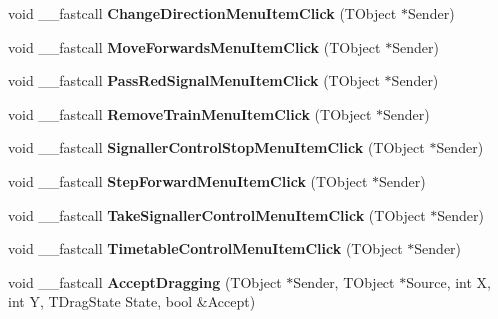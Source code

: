 \begin{DoxyCompactItemize}
\item 
\mbox{\label{class_t_interface_aaaf32c3c815553f7ba70698e0f0071bb}} 
void \+\_\+\+\_\+fastcall {\bfseries Change\+Direction\+Menu\+Item\+Click} (T\+Object $\ast$Sender)
\item 
\mbox{\label{class_t_interface_a50478cade5cae721121f5902528987a7}} 
void \+\_\+\+\_\+fastcall {\bfseries Move\+Forwards\+Menu\+Item\+Click} (T\+Object $\ast$Sender)
\item 
\mbox{\label{class_t_interface_ad7aaed58c91a9ad9598e17fa615024da}} 
void \+\_\+\+\_\+fastcall {\bfseries Pass\+Red\+Signal\+Menu\+Item\+Click} (T\+Object $\ast$Sender)
\item 
\mbox{\label{class_t_interface_a921ff57bd9af8acdd79a7c99d4839218}} 
void \+\_\+\+\_\+fastcall {\bfseries Remove\+Train\+Menu\+Item\+Click} (T\+Object $\ast$Sender)
\item 
\mbox{\label{class_t_interface_a2313bac2c5c5ac3f8b91c46166e35b97}} 
void \+\_\+\+\_\+fastcall {\bfseries Signaller\+Control\+Stop\+Menu\+Item\+Click} (T\+Object $\ast$Sender)
\item 
\mbox{\label{class_t_interface_a0cc484aa9bc0445312ef9191d8212f14}} 
void \+\_\+\+\_\+fastcall {\bfseries Step\+Forward\+Menu\+Item\+Click} (T\+Object $\ast$Sender)
\item 
\mbox{\label{class_t_interface_ab5b80c76a8cc8d2c87f21d323f61c1ce}} 
void \+\_\+\+\_\+fastcall {\bfseries Take\+Signaller\+Control\+Menu\+Item\+Click} (T\+Object $\ast$Sender)
\item 
\mbox{\label{class_t_interface_aec12f0e481024f1268fad36e7188b7a4}} 
void \+\_\+\+\_\+fastcall {\bfseries Timetable\+Control\+Menu\+Item\+Click} (T\+Object $\ast$Sender)
\item 
\mbox{\label{class_t_interface_adfe259347a82aae9fc9538bba9c51cb8}} 
void \+\_\+\+\_\+fastcall {\bfseries Accept\+Dragging} (T\+Object $\ast$Sender, T\+Object $\ast$Source, int X, int Y, T\+Drag\+State State, bool \&Accept)
\item 

\end{DoxyCompactItemize}
